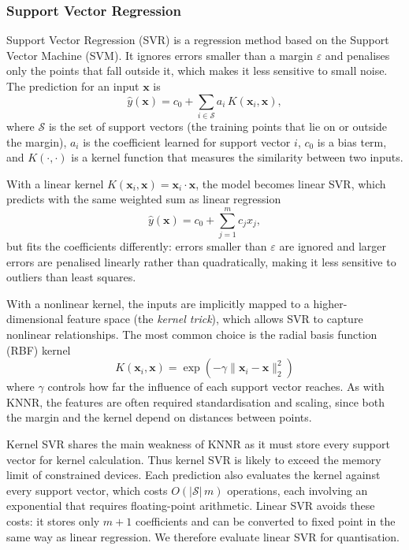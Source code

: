 \subsubsection{Support Vector Regression}
Support Vector Regression (SVR) is a regression method based on the
Support Vector Machine (SVM). It ignores errors smaller than a margin
$\varepsilon$ and penalises only the points that fall outside it,
which makes it less sensitive to small noise. The prediction for an
input $\mathbf{x}$ is
\begin{equation}
    \hat{y}(\mathbf{x}) = c_0 + \sum_{i \in \mathcal{S}} a_i \,
    K(\mathbf{x}_i, \mathbf{x}),
\end{equation}
where $\mathcal{S}$ is the set of support vectors (the training points
that lie on or outside the margin), $a_i$ is the coefficient learned
for support vector $i$, $c_0$ is a bias term, and $K(\cdot,\cdot)$ is
a kernel function that measures the similarity between two inputs.

With a linear kernel $K(\mathbf{x}_i, \mathbf{x}) =
\mathbf{x}_i \cdot \mathbf{x}$, the model becomes linear SVR, which
predicts with the same weighted sum as linear regression
\begin{equation}
    \hat{y}(\mathbf{x}) = c_0 + \sum_{j=1}^{m} c_j x_j,
\end{equation}
but fits the coefficients differently: errors smaller than $\varepsilon$ are
ignored and larger errors are penalised linearly rather than quadratically,
making it less sensitive to outliers than least squares.

With a nonlinear kernel, the inputs are implicitly mapped to a
higher-dimensional feature space (the \emph{kernel trick}), which
allows SVR to capture nonlinear relationships.
The most common choice is the radial basis function (RBF) kernel
\begin{equation}
    K(\mathbf{x}_i, \mathbf{x}) =
    \exp\left( -\gamma \lVert \mathbf{x}_i - \mathbf{x} \rVert_2^2 \right)
\end{equation}
where $\gamma$ controls how far the influence of each support vector
reaches. As with KNNR, the features are often required standardisation and
scaling, since both the margin and the kernel depend on distances
between points.

Kernel SVR shares the main weakness of KNNR as it must store
every support vector for kernel calculation. Thus kernel SVR is likely to
exceed the memory limit of constrained devices. Each prediction also
evaluates the kernel against
every support vector, which costs $O(|\mathcal{S}|\,m)$ operations,
each involving an exponential that requires floating-point
arithmetic. Linear SVR avoids these costs: it stores only $m+1$
coefficients and can be converted to fixed point in the same way as
linear regression. We therefore evaluate linear SVR for quantisation.

